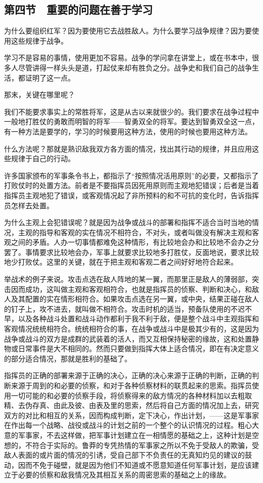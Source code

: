 \subsection{第四节　重要的问题在善于学习}

为什么要组织红军？因为要使用它去战胜敌人。为什么要学习战争规律？因为要使用这些规律于战争。

学习不是容易的事情，使用更加不容易。战争的学问拿在讲堂上，或在书本中，很多人尽管讲得一样头头是道，打起仗来却有胜负之分。战争史和我们自己的战争生活，都证明了这一点。

那末，关键在哪里呢？

我们不能要求事实上的常胜将军，这是从古以来就很少的。我们要求在战争过程中一般地打胜仗的勇敢而明智的将军——智勇双全的将军。要达到智勇双全这一点，有一种方法是要学的，学习的时候要用这种方法，使用的时候也要用这种方法。

什么方法呢？那就是熟识敌我双方各方面的情况，找出其行动的规律，并且应用这些规律于自己的行动。

许多国家颁布的军事条令书上，都指示了“按照情况活用原则”的必要，又都指示了打败仗时的处置方法。前者是不要指挥员因死用原则而主观地犯错误；后者是当着指挥员主观地犯了错误，或客观情况起了非所预料的和不可抗的变化时，告诉指挥员怎样去处置。

为什么主观上会犯错误呢？就是因为战争或战斗的部署和指挥不适合当时当地的情况，主观的指导和客观的实在情况不相符合，不对头，或者叫做没有解决主观和客观之间的矛盾。人办一切事情都难免这种情形，有比较地会办和比较地不会办之分罢了。事情要求比较地会办，军事上就要求比较地多打胜仗，反面地说，要求比较地少打败仗。这里的关键，就在于把主观和客观二者之间好好地符合起来。

举战术的例子来说。攻击点选在敌人阵地的某一翼，而那里正是敌人的薄弱部，突击因而成功，这叫做主观和客观相符合，也就是指挥员的侦察、判断和决心，和敌人及其配置的实在情形相符合。如果攻击点选在另一翼，或中央，结果正碰在敌人的钉子上，攻不进去，就叫做不相符合。攻击时机的适当，预备队使用的不迟不早，以及各种战斗处置和战斗动作都利于我不利于敌，便是整个战斗中主观指挥和客观情况统统相符合。统统相符合的事，在战争或战斗中是极其少有的，这是因为战争或战斗的双方是成群的武装着的活人，而又互相保持秘密的缘故，这和处置静物或日常事件是大不相同的。然而只要做到指挥大体上适合情况，即在有决定意义的部分适合情况，那就是胜利的基础了。

指挥员的正确的部署来源于正确的决心，正确的决心来源于正确的判断，正确的判断来源于周到的和必要的侦察，和对于各种侦察材料的联贯起来的思索。指挥员使用一切可能的和必要的侦察手段，将侦察得来的敌方情况的各种材料加以去粗取精、去伪存真、由此及彼、由表及里的思索，然后将自己方面的情况加上去，研究双方的对比和相互的关系，因而构成判断，定下决心，作出计划，——这是军事家在作出每一个战略、战役或战斗的计划之前的一个整个的认识情况的过程。粗心大意的军事家，不去这样做，把军事计划建立在一相情愿的基础之上，这种计划是空想的，不符合于实际的。鲁莽的专凭热情的军事家之所以不免于受敌人的欺骗，受敌人表面的或片面的情况的引诱，受自己部下不负责任的无真知灼见的建议的鼓动，因而不免于碰壁，就是因为他们不知道或不愿意知道任何军事计划，是应该建立于必要的侦察和敌我情况及其相互关系的周密思索的基础之上的缘故。

